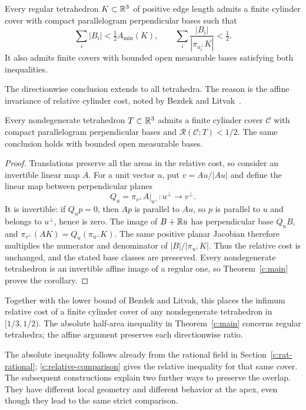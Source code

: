 \begin{theorem}\label{c:main}
Every regular tetrahedron $K\subset\mathbb R^3$ of positive edge length admits a finite
cylinder cover with compact parallelogram perpendicular bases such that
\[
 \sum_i|B_i|<\tfrac12 A_{\min}(K),
 \qquad
 \sum_i\frac{|B_i|}{|\pi_{u_i^\perp}K|}<\tfrac12.
\]
It also admits finite covers with bounded open measurable bases
satisfying both inequalities.
\end{theorem}

The directionwise conclusion extends to all tetrahedra. The reason is
the affine invariance of relative cylinder cost, noted by Bezdek and
Litvak~\cite[Section~3]{BL2009}.

\begin{corollary}\label{c:affine-tetrahedra}
Every nondegenerate tetrahedron $T\subset\mathbb R^3$ admits a finite cylinder
cover $\mathcal C$ with compact parallelogram perpendicular bases and
$\mathcal R(\mathcal C;T)<1/2$. The same conclusion holds with bounded
open measurable bases.
\end{corollary}
\begin{proof}
Translations preserve all the areas in the relative cost, so consider
an invertible linear map $A$. For a unit vector $u$, put
$v=Au/|Au|$ and define the linear map between perpendicular planes
\[
 Q_u=\pi_{v^\perp}A\big|_{u^\perp}:u^\perp\longrightarrow v^\perp.
\]
It is invertible: if $Q_up=0$, then $Ap$ is parallel to $Au$, so
$p$ is parallel to $u$ and belongs to $u^\perp$, hence is zero.
The image of $B+\mathbb R u$ has perpendicular base $Q_uB$, and
$\pi_{v^\perp}(AK)=Q_u(\pi_{u^\perp}K)$. The same positive planar
Jacobian therefore multiplies the numerator and denominator of
$|B|/|\pi_{u^\perp}K|$. Thus the relative cost is unchanged, and the
stated base classes are preserved. Every nondegenerate tetrahedron is
an invertible affine image of a regular one, so Theorem~\ref{c:main}
proves the corollary.
\end{proof}

Together with the lower bound of Bezdek and Litvak, this places the
infimum relative cost of a finite cylinder cover of any nondegenerate
tetrahedron in $[1/3,1/2)$. The absolute half-area inequality in
Theorem~\ref{c:main} concerns regular tetrahedra; the affine argument
preserves each directionwise ratio.

The absolute inequality follows already from the rational field in
Section~\ref{c:rat-rational}; \eqref{c:relative-comparison} gives the
relative inequality for that same cover. The subsequent constructions
explain two further ways to preserve the overlap. They have different
local geometry and different behavior at the apex, even though they
lead to the same strict comparison.

